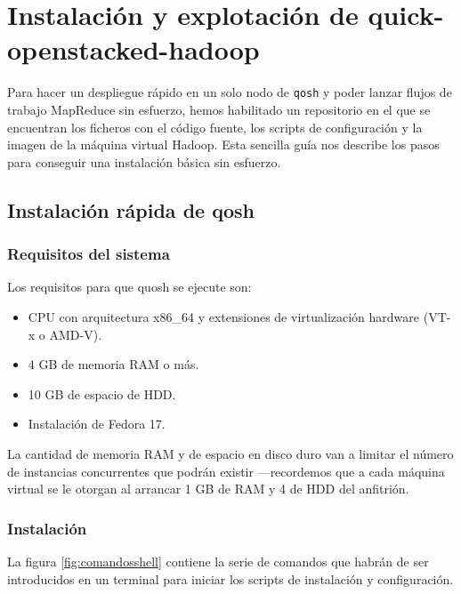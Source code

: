 \chapter{Instalaci\'on y explotaci\'on de quick-openstacked-hadoop}\label{cap:guiainstalacion}
\noindent Para hacer un despliegue r\'apido en un solo nodo de \texttt{qosh} y poder lanzar flujos de trabajo MapReduce sin esfuerzo, hemos habilitado un repositorio en el que se encuentran los ficheros con el c\'odigo fuente, los scripts de configuraci\'on y la imagen de la m\'aquina virtual Hadoop. Esta sencilla gu\'ia nos describe los pasos para conseguir una instalaci\'on b\'asica sin esfuerzo.

\section{Instalaci\'on r\'apida de qosh}\label{sec:instalacionqosh}

\subsection{Requisitos del sistema}\label{subsec:reqsis}
\noindent Los requisitos para que quosh se ejecute son:

\begin{itemize}
\item CPU con arquitectura x86\_64 y extensiones de virtualizaci\'on hardware (VT-x o AMD-V).
\item 4 GB de memoria RAM o m\'as.
\item 10 GB de espacio de HDD.
\item Instalaci\'on de Fedora 17.
\end{itemize}

La cantidad de memoria RAM y de espacio en disco duro van a limitar el n\'umero de instancias concurrentes que podr\'an existir ---recordemos que a cada m\'aquina virtual se le otorgan al arrancar 1 GB de RAM y 4 de HDD del anfitri\'on.

\subsection{Instalaci\'on}\label{subsec:instalacion}
\noindent La figura \ref{fig:comandosshell} contiene la serie de comandos que habr\'an de ser introducidos en un terminal para iniciar los scripts de instalaci\'on y configuraci\'on.

